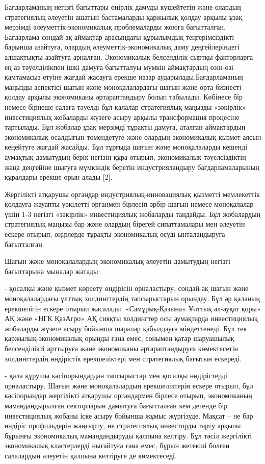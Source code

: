 Бағдарламаның негізгі бағыттары өңірлік дамуды күшейтетін және олардың
стратегиялық әлеуетін ашатын бастамаларды қаржылық қолдау арқылы ұзақ
мерзімді әлеуметтік-экономикалық проблемаларды жоюға бағытталған.
Бағдарлама сондай-ақ аймақтар арасындағы құрылымдық теңгерімсіздікті
барынша азайтуға, олардың әлеуметтік-экономикалық даму деңгейлеріндегі
алшақтықты азайтуға арналған. Экономикалық белсенділік сыртқы
факторларға ең аз тәуелділікпен ішкі дамуға бағытталуы мүмкін
аймақтардың өзін-өзі қамтамасыз етуіне жағдай жасауға ерекше назар
аударылады.Бағдарламаның маңызды аспектісі шағын және моноқалалардағы
шағын және орта бизнесті қолдау арқылы экономиканы әртараптандыру болып
табылады. Көбінесе бір немесе бірнеше салаға тәуелді бұл қалалар
стратегиялық маңызды «зәкірлік» инвестициялық жобаларды жүзеге асыру
арқылы трансформация процесіне тартылады. Бұл жобалар ұзақ мерзімді
тұрақты дамуға, аталған аймақтардың экономикалық осалдығын төмендетуге
және олардың экономикалық қызмет аясын кеңейтуге жағдай жасайды. Бұл
тұрғыда шағын және моноқалаларды кешенді аумақтық дамытудың берік
негізін құра отырып, экономикалық тәуелсіздіктің жаңа деңгейіне шығуға
мүмкіндік беретін индустрияландыру бағдарламаларының құралдары ерекше
орын алады {[}2{]}.

Жергілікті атқарушы органдар индустриялық-инновациялық қызметті
мемлекеттік қолдауға жауапты уәкілетті органмен бірлесіп әрбір шағын
немесе моноқалалар үшін 1-3 негізгі «зәкірлік» инвестициялық жобаларды
таңдайды. Бұл жобалардың стратегиялық маңызы бар және олардың бірегей
сипаттамалары мен әлеуетін ескере отырып, өңірлерде тұрақты экономикалық
өсуді ынталандыруға бағытталған.

Шағын және моноқалалардың экономикалық әлеуетін дамытудың негізгі
бағыттарына мыналар жатады:

- қосалқы және қызмет көрсету өндірісін орналастыру, сондай-ақ шағын
және моноқалалардағы ұлттық холдингтердің тапсырыстарын орындау. Бұл әр
қаланың ерекшелігін ескере отырып жасалады. «Самұрық-Қазына» Ұлттық
әл-ауқат қоры» АҚ және «НГК ҚазАгро» АҚ сияқты холдингтер осы аумақтарда
инвестициялық жобаларды жүзеге асыру бойынша шаралар қабылдауға
міндеттенеді. Бұл тек қаржылық-экономикалық орынды ғана емес, сонымен
қатар шаруашылық белсенділікті арттыруға және экономиканы
әртараптандыруға көмектесетін холдингтердің өндірістік ерекшеліктері мен
стратегиялық бағытын ескереді.

- қала құрушы кәсіпорындардан тапсырыстар мен қосалқы өндірістерді
орналастыру. Шағын және моноқалалардың ерекшеліктерін ескере отырып, бұл
кәсіпорындар жергілікті атқарушы органдармен бірлесе отырып,
экономиканың мамандандырылған секторларын дамытуға бағытталған кем
дегенде бір инвестициялық жобаны іске асыру бойынша жұмыс жүргізуде.
Мақсат -- не бар өндіріс профильдерін жаңғырту, не стратегиялық
инвесторды тарту арқылы бұрынғы экономикалық мамандандыруды қалпына
келтіру. Бұл тәсіл жергілікті экономикалық кластерлерді нығайтуға ғана
емес, бұрын жетекші болған салалардың әлеуетін қалпына келтіруге де
көмектеседі.

